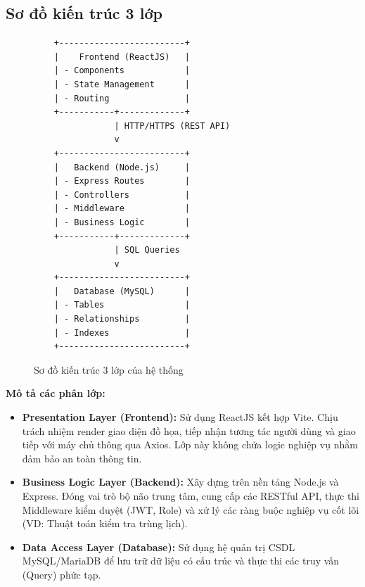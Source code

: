 \documentclass[18pt,a4paper]{report}
\begin{document}
\subsection{Sơ đồ kiến trúc 3 lớp}
\begin{figure}[!h]
    \centering
    \begin{verbatim}
    +-------------------------+
    |    Frontend (ReactJS)   |
    | - Components            |
    | - State Management      |
    | - Routing               |
    +-----------+-------------+
                | HTTP/HTTPS (REST API)
                v
    +-------------------------+
    |   Backend (Node.js)     |
    | - Express Routes        |
    | - Controllers           |
    | - Middleware            |
    | - Business Logic        |
    +-----------+-------------+
                | SQL Queries
                v
    +-------------------------+
    |   Database (MySQL)      |
    | - Tables                |
    | - Relationships         |
    | - Indexes               |
    +-------------------------+
    \end{verbatim}
    \caption{Sơ đồ kiến trúc 3 lớp của hệ thống}
    \label{fig:arch_overall}
\end{figure}

\textbf{Mô tả các phân lớp:}
\begin{itemize}[leftmargin=1.2cm]
    \item \textbf{Presentation Layer (Frontend):} Sử dụng ReactJS kết hợp Vite. Chịu trách nhiệm render giao diện đồ họa, tiếp nhận tương tác người dùng và giao tiếp với máy chủ thông qua Axios. Lớp này không chứa logic nghiệp vụ nhằm đảm bảo an toàn thông tin.
    \item \textbf{Business Logic Layer (Backend):} Xây dựng trên nền tảng Node.js và Express. Đóng vai trò bộ não trung tâm, cung cấp các RESTful API, thực thi Middleware kiểm duyệt (JWT, Role) và xử lý các ràng buộc nghiệp vụ cốt lõi (VD: Thuật toán kiểm tra trùng lịch).
    \item \textbf{Data Access Layer (Database):} Sử dụng hệ quản trị CSDL MySQL/MariaDB để lưu trữ dữ liệu có cấu trúc và thực thi các truy vấn (Query) phức tạp.
\end{itemize}
\end{document}
